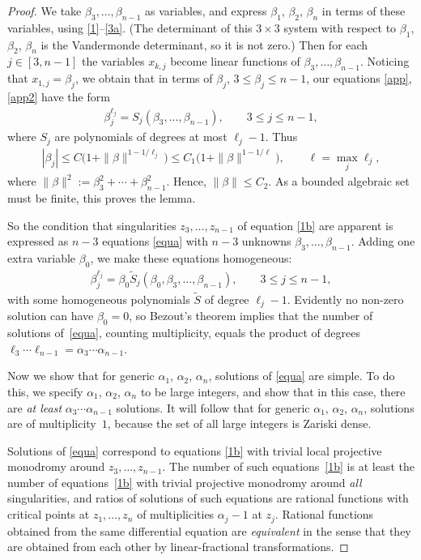 \documentclass[11pt]{article}
\numberwithin{equation}{section}
\def\lc{,\allowbreak\ldots,\allowbreak}
\begin{document}
\begin{proof} We take $\beta_3\lc\beta_{n-1}$ as variables, and express $\beta_1$, $\beta_2$, $\beta_n$ in terms of these variables, using \eqref{1}--\eqref{3a}. (The determinant of this $3\times3$ system with respect to $\beta_1$, $\beta_2$, $\beta_n$ is the Vandermonde determinant, so it is not zero.) Then for each $j\in[3,n-1]$ the variables $x_{k,j}$ become linear functions of $\beta_3\lc\beta_{n-1}$. Noticing that $x_{1,j}=\beta_j$, we obtain that in terms of $\beta_j$, $3\leq\beta_j\leq n-1$, our equations \eqref{app}, \eqref{app2} have the form
\begin{gather}\label{equa}
\beta_j^{\ell_j}=S_j(\beta_3\lc\beta_{n-1}),\qquad 3\leq j\leq n-1,
\end{gather}
where $S_j$ are polynomials of degrees at most $\ell_j-1$. Thus
\begin{gather*}
|\beta_j|\leq C\bigl(1+\|\beta\|^{1-1/\ell_j}\bigr)\leq C_1\bigl(1+\|\beta\|^{1-1/\ell}\bigr),\qquad \ell=\max_j\ell_j,
\end{gather*}
where $\|\beta\|^2:=\beta_3^2+\cdots+\beta_{n-1}^2$. Hence, $\|\beta\|\leq C_2 $. As a bounded algebraic set must be finite, this proves the lemma.

So the condition that singularities $z_3\lc z_{n-1}$ of equation \eqref{1b} are apparent is expressed as $n-3$ equations \eqref{equa} with $n-3$ unknowns $\beta_3\lc\beta_{n-1}$. Adding one extra variable $\beta_0$, we make these equations homogeneous:
\begin{gather*}%
\beta_j^{\ell_j}=\beta_0 \widetilde S_j(\beta_0,\beta_3\lc\beta_{n-1}),\qquad 3\leq j\leq n-1,
\end{gather*}
with some homogeneous polynomials $\widetilde S$ of degree $\ell_j-1$. Evidently no non-zero solution can have $\beta_0=0$, so Bezout's theorem \cite[Chapter~IV, Section~1]{Sh} implies that the number of solutions
of~\eqref{equa}, counting multiplicity, equals the product of degrees $\ell_3\cdots\ell_{n-1}=\alpha_3\cdots\alpha_{n-1}$.

Now we show that for generic $\alpha_1$, $\alpha_2$, $\alpha_n $, solutions of \eqref{equa} are simple. To do this, we specify $\alpha_1$, $\alpha_2$, $\alpha_n$ to be large integers, and show that in this case, there are {\em at least} $\alpha_3\cdots\alpha_{n-1}$ solutions. It will follow that for generic $\alpha_1$, $\alpha_2$, $\alpha_n $, solutions are of multiplicity~$1$, because the set of all large integers is Zariski dense.

Solutions of \eqref{equa} correspond to equations \eqref{1b} with trivial local projective monodromy around $z_3\lc z_{n-1}$. The number of such equa\-tions~\eqref{1b} is at least the number of equations~\eqref{1b} with trivial projective monodromy around {\em all} singularities, and ratios of solutions of such equations are rational functions with critical points at $z_1\lc z_n$ of multiplicities $\alpha_j-1$ at $z_j$. Rational functions obtained from the same differential equation are {\em equivalent} in the sense that they are obtained from each other by linear-fractional transformations.
\end{proof}
\end{document}
